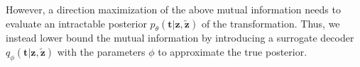 \documentclass[10pt,journal,compsoc,twoside]{IEEEtran}
\begin{document}
%




%

However, a direction maximization of the above mutual information needs to evaluate an intractable posterior $p_\theta(\mathbf t|\mathbf z,\mathbf {\tilde z})$ of the transformation. Thus, we instead lower bound the mutual information by introducing a surrogate decoder $q_\phi(\mathbf t|\mathbf z,\mathbf {\tilde z})$ with the parameters $\phi$ to approximate the true posterior.
\end{document}
